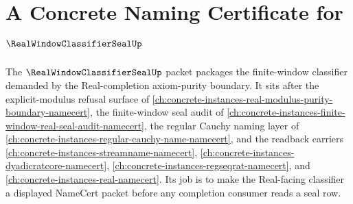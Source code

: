 \chapter{A Concrete Naming Certificate for $\RealWindowClassifierSealUp$}
\label{ch:concrete-instances-real-window-classifier-seal-namecert}

The $\RealWindowClassifierSealUp$ packet packages the finite-window classifier demanded by the Real-completion axiom-purity boundary. It sits after the explicit-modulus refusal surface of \autoref{ch:concrete-instances-real-modulus-purity-boundary-namecert}, the finite-window seal audit of \autoref{ch:concrete-instances-finite-window-real-seal-audit-namecert}, the regular Cauchy naming layer of \autoref{ch:concrete-instances-regular-cauchy-name-namecert}, and the readback carriers \autoref{ch:concrete-instances-streamname-namecert}, \autoref{ch:concrete-instances-dyadicratcore-namecert}, \autoref{ch:concrete-instances-regseqrat-namecert}, and \autoref{ch:concrete-instances-real-namecert}. Its job is to make the Real-facing classifier a displayed NameCert packet before any completion consumer reads a seal row.

